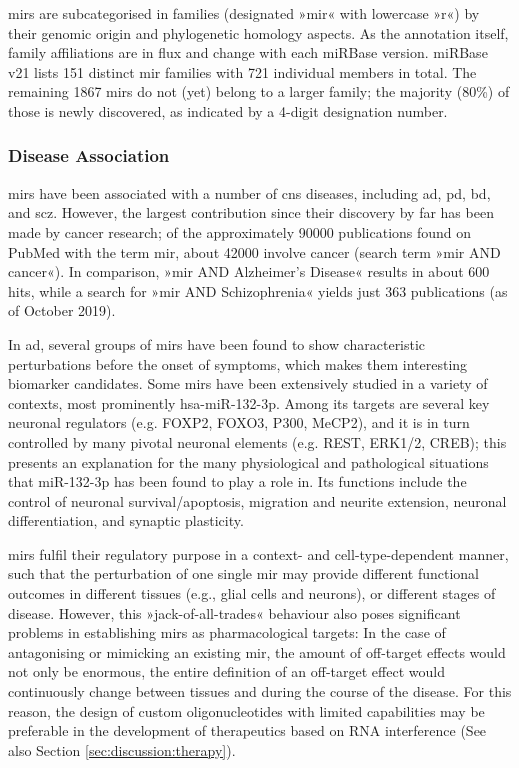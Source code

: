 \acp{mir} are subcategorised in families (designated »mir« with lowercase »r«) by their genomic origin and phylogenetic homology aspects. As the annotation itself, family affiliations are in flux and change with each miRBase version. miRBase v21 lists 151 distinct \ac{mir} families with 721 individual members in total. The remaining 1867 \acp{mir} do not (yet) belong to a larger family; the majority (80\%) of those is newly discovered, as indicated by a 4-digit designation number.

\subsubsection{Disease Association}
\acp{mir} have been associated with a number of \ac{cns} diseases, including \ac{ad}, \ac{pd}, \ac{bd}, and \ac{scz}. However, the largest contribution since their discovery by far has been made by cancer research; of the approximately \num{90000} publications found on PubMed with the term \ac{mir}, about \num{42000} involve cancer (search term »\ac{mir} AND cancer«). In comparison, »\ac{mir} AND Alzheimer's Disease« results in about 600 hits, while a search for »\ac{mir} AND Schizophrenia« yields just 363 publications (as of October 2019).

In \ac{ad}, several groups of \acp{mir} have been found to show characteristic perturbations before the onset of symptoms, which makes them interesting biomarker candidates.\cite{Salta2017a} Some \acp{mir} have been extensively studied in a variety of contexts, most prominently hsa-miR-132-3p. Among its targets are several key neuronal regulators (e.g. FOXP2, FOXO3, P300, MeCP2), and it is in turn controlled by many pivotal neuronal elements (e.g. REST, ERK1/2, CREB); this presents an explanation for the many physiological and pathological situations that miR-132-3p has been found to play a role in. Its functions include the control of neuronal survival/apoptosis, migration and neurite extension, neuronal differentiation, and synaptic plasticity. 

\acp{mir} fulfil their regulatory purpose in a context- and cell-type-dependent manner,\cite{Lu2015} such that the perturbation of one single \ac{mir} may provide different functional outcomes in different tissues (e.g., glial cells and neurons), or different stages of disease. However, this »jack-of-all-trades« behaviour also poses significant problems in establishing \acp{mir} as pharmacological targets: In the case of antagonising or mimicking an existing \ac{mir}, the amount of off-target effects would not only be enormous, the entire definition of an off-target effect would continuously change between tissues and during the course of the disease. For this reason, the design of custom oligonucleotides with limited capabilities may be preferable in the development of therapeutics based on RNA interference (See also Section \ref{sec:discussion:therapy}).

